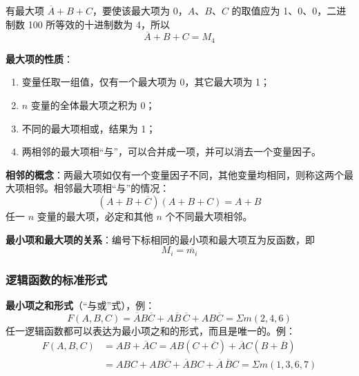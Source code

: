 \begin{example}[最大项编号]
\label{ex:最大项编号}
有最大项 $\overline{A}+B+C$，要使该最大项为 0，$A$、$B$、$C$ 的取值应为 1、0、0，二进制数 100 所等效的十进制数为 4，所以
\begin{equation}
	\overline{A}+B+C=M_4
	\label{eq:标准:最大项编号例}
\end{equation}
\end{example}

\textbf{最大项的性质}：
\begin{enumerate}
	\item 变量任取一组值，仅有一个最大项为 0，其它最大项为 1；
	\item $n$ 变量的全体最大项之积为 0；
	\item 不同的最大项相或，结果为 1；
	\item 两相邻的最大项相“与”，可以合并成一项，并可以消去一个变量因子。
\end{enumerate}

\textbf{相邻的概念}：两最大项如仅有一个变量因子不同，其他变量均相同，则称这两个最大项相邻。相邻最大项相“与”的情况：
\begin{equation}
	(A+B+\overline{C})(A+B+C)=A+B
	\label{eq:标准:相邻最大项合并}
\end{equation}
任一 $n$ 变量的最大项，必定和其他 $n$ 个不同最大项相邻。

\textbf{最小项和最大项的关系}：编号下标相同的最小项和最大项互为反函数，即
\begin{equation}
	M_i=\overline{m_i}
	\label{eq:标准:最小项最大项关系}
\end{equation}

\subsubsection{逻辑函数的标准形式}

\textbf{最小项之和形式}（“与或”式），例：
\begin{equation}
	F(A,B,C)=\overline{A}B\overline{C}+A\overline{B}\,\overline{C}+AB\overline{C}=\Sigma m(2,4,6)
	\label{eq:标准:最小项之和例}
\end{equation}
任一逻辑函数都可以表达为最小项之和的形式，而且是唯一的。例：
\begin{equation}
	\begin{aligned}
		F(A,B,C)&=AB+\overline{A}C=AB(C+\overline{C})+\overline{A}C(B+\overline{B})\\
		&=ABC+AB\overline{C}+\overline{A}BC+\overline{A}\,\overline{B}C=\Sigma m(1,3,6,7)
	\end{aligned}
	\label{eq:标准:最小项之和例2}
\end{equation}

